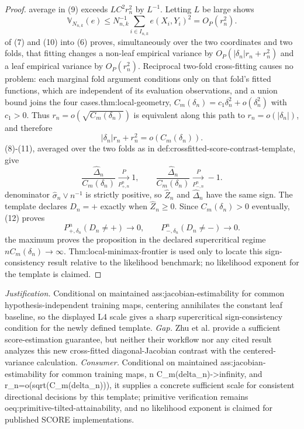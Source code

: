 \documentclass{article}
\begin{document}
\begin{proof}
average in (9) exceeds \(LC^2r_n^2\) by \(L^{-1}\). Letting \(L\) be large shows\n\[\mathbb V_{N_{n,k}}(e)\le N_{n,k}^{-1}\sum_{i\in I_{n,k}}e(X_i,Y_i)^2=O_P(r_n^2).\tag{10}\]\nSubstitution of (7) and (10) into (6) proves, simultaneously over the two coordinates and two folds, that fitting changes a non-leaf empirical variance by \(O_P(|\delta_n|r_n+r_n^2)\) and a leaf empirical variance by \(O_P(r_n^2)\). Reciprocal two-fold cross-fitting causes no problem: each marginal fold argument conditions only on that fold's fitted functions, which are independent of its evaluation observations, and a union bound joins the four cases.\n\nBy thm:local-geometry, \(C_m(\delta_n)=c_1\delta_n^2+o(\delta_n^2)\) with \(c_1>0\). Thus \(r_n=o(\sqrt{C_m(\delta_n)})\) is equivalent along this path to \(r_n=o(|\delta_n|)\), and therefore\n\[|\delta_n|r_n+r_n^2=o(C_m(\delta_n)).\tag{11}\]\nEquations (8)-(11), averaged over the two folds as in def:crossfitted-score-contrast-template, give\n\[\frac{\widehat\Delta_n}{C_m(\delta_n)}\xrightarrow[P_{+,n}^n]{P}1,\qquad \frac{\widehat\Delta_n}{C_m(\delta_n)}\xrightarrow[P_{-,n}^n]{P}-1.\tag{12}\]\nThe denominator \(\widehat\sigma_n\vee n^{-1}\) is strictly positive, so \(\widehat Z_n\) and \(\widehat\Delta_n\) have the same sign. The template declares \(D_n=+\) exactly when \(\widehat Z_n\ge0\). Since \(C_m(\delta_n)>0\) eventually, (12) proves\n\[P_{+,\delta_n}^n(D_n\ne+)\to0,\qquad P_{-,\delta_n}^n(D_n\ne-)\to0.\]\nTaking the maximum proves the proposition in the declared supercritical regime \(nC_m(\delta_n)\to\infty\). Thm:local-minimax-frontier is used only to locate this sign-consistency result relative to the likelihood benchmark; no likelihood exponent for the template is claimed.
\end{proof}
\par\smallskip\noindent \textit{Justification.} Conditional on maintained ass:jacobian-estimability for common hypothesis-independent training maps, centering annihilates the constant leaf baseline, so the displayed L4 scale gives a sharp supercritical sign-consistency condition for the newly defined template. \textit{Gap.} Zhu et al. provide a sufficient score-estimation guarantee, but neither their workflow nor any cited result analyzes this new cross-fitted diagonal-Jacobian contrast with the centered-variance calculation. \textit{Consumer.} Conditional on maintained ass:jacobian-estimability for common training maps, n C_m(delta_n)->infinity, and r_n=o(sqrt(C_m(delta_n))), it supplies a concrete sufficient scale for consistent directional decisions by this template; primitive verification remains oeq:primitive-tilted-attainability, and no likelihood exponent is claimed for published SCORE implementations.
\end{document}

